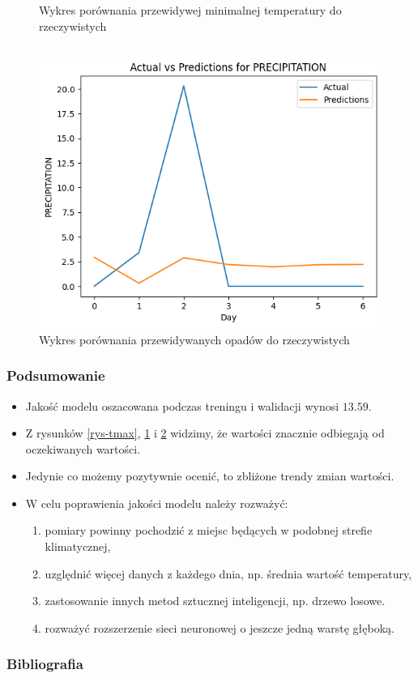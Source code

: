 \documentclass[usepdftitle=false,24pt]{beamer}
\begin{document}
\begin{frame}
\begin{columns}[T]
\begin{column}{.5\textwidth}
\begin{figure}
                \caption{Wykres porównania przewidywej minimalnej temperatury do rzeczywistych}
                \label{rys-tmin}
            \end{figure}
        \end{column}
    \end{columns}

\end{frame}

\begin{frame}
    \begin{figure}
        \includegraphics[width=.75\textwidth]{images/opady.png}
        \caption{Wykres porównania przewidywanych opadów do rzeczywistych}
        \label{rys-opady}
    \end{figure}
\end{frame}

\begin{frame}
    \frametitle{Podsumowanie}

    \begin{itemize}
        \item Jakość modelu oszacowana podczas treningu i walidacji wynosi $13.59$.
        \item Z rysunków \ref{rys-tmax}, \ref{rys-tmin} i \ref{rys-opady} widzimy, że wartości znacznie odbiegają od oczekiwanych wartości.
        \item Jedynie co możemy pozytywnie ocenić, to zbliżone trendy zmian wartości.
        \item W celu poprawienia jakości modelu należy rozważyć:
        \begin{enumerate}
            \item pomiary powinny pochodzić z miejsc będących w  podobnej strefie klimatycznej,
            \item uzględnić więcej danych z każdego dnia, np. średnia wartość temperatury,
            \item zastosowanie innych metod sztucznej inteligencji, np. drzewo losowe.
            \item rozważyć rozszerzenie sieci neuronowej o jeszcze jedną warstę głęboką.
        \end{enumerate}
    \end{itemize}

\end{frame}

\begin{frame}[allowframebreaks]
    \frametitle{Bibliografia}
    
    

\end{frame}
\end{document}
